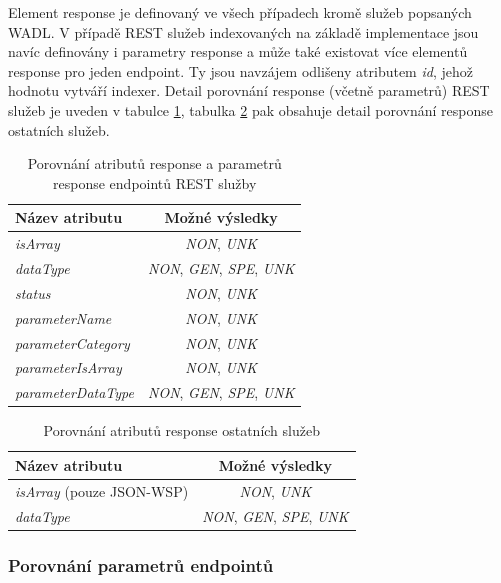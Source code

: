 \documentclass[czech,DP]{thesiskiv}
\begin{document}
Element response je definovaný ve všech případech kromě služeb popsaných WADL. V případě REST služeb indexovaných na základě implementace jsou navíc definovány i parametry response a může také existovat více elementů response pro jeden endpoint. Ty jsou navzájem odlišeny atributem \textit{id}, jehož hodnotu vytváří indexer. Detail porovnání response (včetně parametrů) REST služeb je uveden v tabulce \ref{tab:resp-rest-cmp}, tabulka \ref{tab:resp-ws-cmp} pak obsahuje detail porovnání response ostatních služeb.

\begin{table}[h]
	\centering
	\begin{tabular}{|l|c|}
		\hline
		Název atributu & Možné výsledky \\
		\hline
		\hline
		\textit{isArray} & \textit{NON}, \textit{UNK} \\
		\hline
		\textit{dataType} &  \textit{NON}, \textit{GEN}, \textit{SPE}, \textit{UNK} \\
		\hline
		\textit{status} &  \textit{NON}, \textit{UNK} \\
		\hline
		\textit{parameterName} & \textit{NON}, \textit{UNK} \\
		\hline
		\textit{parameterCategory} & \textit{NON}, \textit{UNK} \\
		\hline
		\textit{parameterIsArray} &  \textit{NON}, \textit{UNK} \\
		\hline
		\textit{parameterDataType} & \textit{NON}, \textit{GEN}, \textit{SPE}, \textit{UNK} \\
		\hline
	\end{tabular}
	\caption{Porovnání atributů response a parametrů response endpointů REST služby}
	\label{tab:resp-rest-cmp}
\end{table}

\begin{table}[h]
	\centering
	\begin{tabular}{|l|c|}
		\hline
		Název atributu & Možné výsledky \\
		\hline
		\hline
		\textit{isArray} (pouze JSON-WSP) & \textit{NON}, \textit{UNK} \\
		\hline
		\textit{dataType} & \textit{NON}, \textit{GEN}, \textit{SPE}, \textit{UNK} \\
		\hline
	\end{tabular}
	\caption{Porovnání atributů response ostatních služeb}
	\label{tab:resp-ws-cmp}
\end{table}

\subsubsection{Porovnání parametrů endpointů}
\end{document}
